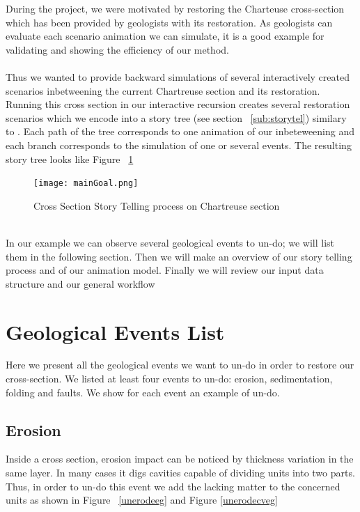\documentclass[12pt, a4paper]{report} %
\begin{document}
During the project, we were motivated by restoring the Charteuse cross-section which has been provided by geologists with its restoration. As geologists can evaluate each scenario animation we can simulate, it is a good example for validating and showing the efficiency of our method.\\\\
Thus we wanted to provide backward simulations of several interactively created scenarios inbetweening the current Chartreuse section and its restoration. Running this cross section in our interactive recursion creates several restoration scenarios which we encode into a story tree (see section ~\ref{sub:storytel}) similary to \cite{lidal}. Each path of the tree corresponds to one animation of our inbeteweening and each branch corresponds to the simulation of one or several events. The resulting story tree looks like Figure ~\ref{maingoal}
 \begin{figure}[H]
	\centering
	\texttt{[image: mainGoal.png]}
	\caption{Cross Section Story Telling process on Chartreuse section}
	\label{maingoal}
\end{figure}\\


In our example we can observe several geological events to un-do; we will list them in the following section.
Then we will make an overview of our story telling process and of our animation model. Finally we will review our input data structure and our general workflow

\section{Geological Events List}
Here we present all the geological events we want to un-do in order to restore our cross-section.
We listed at least four events to un-do: erosion, sedimentation, folding and faults. We show for each event an example of un-do.
\subsection{Erosion}
Inside a cross section, erosion impact can be noticed by thickness variation in the same layer.
In many cases it digs cavities capable of dividing units into two parts. Thus, in order to un-do this event we add the lacking matter to the concerned units as shown in Figure ~\ref{unerodeeg} and Figure \ref{unerodecveg}
\end{document}
